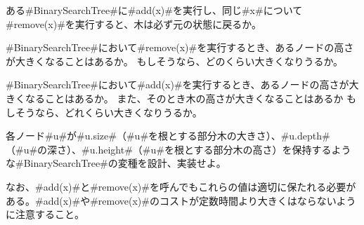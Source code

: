 \begin{exc}
ある#BinarySearchTree#に#add(x)#を実行し、同じ#x#について#remove(x)#を実行すると、木は必ず元の状態に戻るか。
\end{exc}

\begin{exc}
#BinarySearchTree#において#remove(x)#を実行するとき、あるノードの高さが大きくなることはあるか。
もしそうなら、どのくらい大きくなりうるか。
\end{exc}

\begin{exc}
#BinarySearchTree#において#add(x)#を実行するとき、あるノードの高さが大きくなることはあるか。
また、そのとき木の高さが大きくなることはあるか
もしそうなら、どれくらい大きくなりうるか。
\end{exc}

\begin{exc}
各ノード#u#が#u.size#（#u#を根とする部分木の大きさ）、#u.depth#（#u#の深さ）、#u.height#（#u#を根とする部分木の高さ）を保持するような#BinarySearchTree#の変種を設計、実装せよ。

なお、#add(x)#と#remove(x)#を呼んでもこれらの値は適切に保たれる必要がある。#add(x)#や#remove(x)#のコストが定数時間より大きくはならないように注意すること。
\end{exc}
